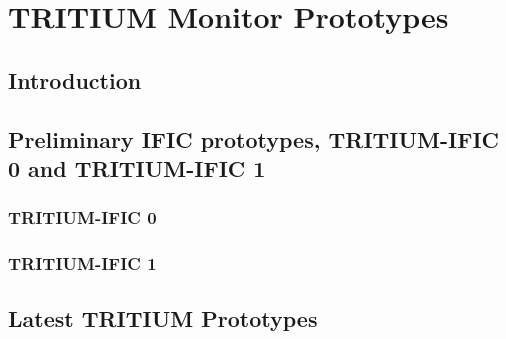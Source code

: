 \documentclass[12pt,a4paper]{book}
\begin{document}

\chapter{TRITIUM Monitor Prototypes}\label{chap:Prototypes}	
	\section{Introduction}\label{sec:IntroPrototypes}
	
	\newpage
	
	\section[Preliminary Prototypes]{Preliminary IFIC prototypes, TRITIUM-IFIC 0 and TRITIUM-IFIC 1}\label{sec:Preliminary_prototypes}
	
		
		\subsection{TRITIUM-IFIC 0}\label{subsec:TritiumIFIC0}
		
		
		\subsection{TRITIUM-IFIC 1}\label{subsec:TritiumIFIC1}
		
		\newpage
				
	\section{Latest TRITIUM Prototypes}\label{sec:LatestTritiumPrototypes}
	
	
\end{document}
